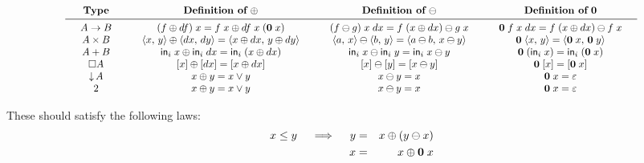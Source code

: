 \documentclass{article}
\begin{document}
\begin{center}
\[
\scalebox{0.9}{\(
\arraycolsep=1.5em
\begin{array}{cccc}
  \textbf{Type}
  & {\textbf{Definition of}~\oplus}
  & {\textbf{Definition of}~\ominus}
  & {\textbf{Definition of}~\mb{0}}
  \\ \midrule
  A \to B
  & (f \oplus df)\; x = f\; x \oplus df\; x\; (\mb{0}\; x)
  & (f \ominus g)\; x \;dx = f\; (x \oplus dx) \ominus g \; x
  & \mb{0}\; f\; x\; dx = f\; (x \oplus dx) \ominus f\; x
  \\
  A \x B
  & \pair{x}{y} \oplus \pair{dx}{dy} = \pair{x \oplus dx}{y \oplus dy}
  & \pair{a}{x} \ominus \pair{b}{y} = \pair{a \ominus b}{x \ominus y}
  & \mb{0} \; \pair{x}{y} = \pair{\mb{0}\; x}{\mb{0}\; y}
  \\
  A + B
  & \inj{i}{x} \oplus \inj{i}{dx} = \inj{i}{(x \oplus dx)}
  & \inj{i}{x} \ominus \inj{i}{y} = \inj{i}{x \ominus y}
  & \mb{0}\; (\inj{i}{x}) = \inj{i}{(\mb{0}\;x)}
  \\
  \Disc{A}
  & \disc{x} \oplus \disc{dx} = \disc{x \oplus dx}
  & \disc{x} \ominus \disc{y} = \disc{x \ominus y}
  & \mb{0}\; \disc{x} = \disc{\mb{0}\; x}
  \\
  \Down{A}
  & x \oplus y = x \vee y
  & x \ominus y = x
  & \mb{0}\; x = \unit
  \\
  \tbool
  & x \oplus y = x \vee y
  & x \ominus y = x
  & \mb{0}\; x = \unit
\end{array}
\)}
\]
\end{center}

These should satisfy the following laws:
\begin{eqnarray}
  x \le y \quad\implies\quad
  y &=& x \oplus (y \ominus x)\\
  x &=& x \oplus \mathbf{0}\; x
\end{eqnarray}




\end{document}
